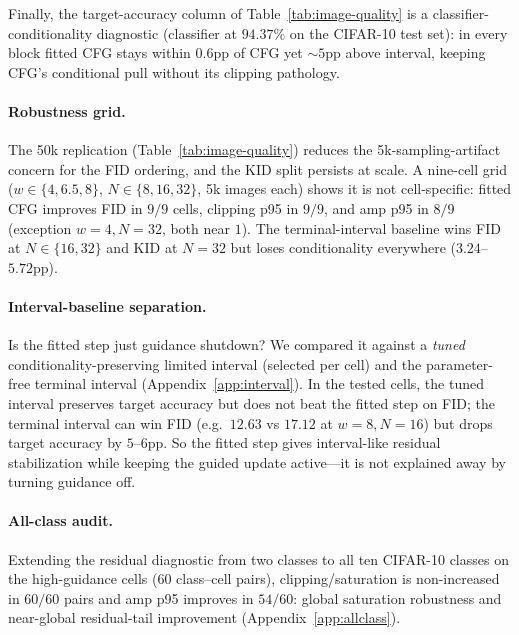 \documentclass{article} %
\theoremstyle{plain}
\theoremstyle{definition}
\theoremstyle{remark}
\providecommand{\verify}[1]{} %
\begin{document}
Finally, the target-accuracy column of Table~\ref{tab:image-quality} is a
classifier-conditionality diagnostic (classifier at $94.37\%$ on the CIFAR-10 test
set): in every block fitted CFG stays within $0.6$pp of CFG yet ${\sim}5$pp
above interval, keeping CFG's conditional pull without its clipping pathology.

\paragraph{Robustness grid.}
The 50k replication (Table~\ref{tab:image-quality}) reduces the 5k-sampling-artifact
concern for the FID ordering, and the KID split persists at scale.  A nine-cell grid
($w\in\{4,6.5,8\}$, $N\in\{8,16,32\}$, 5k images each) shows it is not
cell-specific: fitted CFG improves FID in $9/9$ cells, clipping p95 in $9/9$,
and amp p95 in $8/9$ (exception $w{=}4,N{=}32$, both near $1$).  The
terminal-interval baseline wins FID at $N\in\{16,32\}$ and KID at $N=32$ but
loses conditionality everywhere ($3.24$--$5.72$pp).

\paragraph{Interval-baseline separation.}
Is the fitted step just guidance shutdown?  We compared it against a
\emph{tuned} conditionality-preserving limited interval (selected per cell) and
the parameter-free terminal interval (Appendix~\ref{app:interval}).  In the
tested cells, the tuned interval preserves target accuracy but does not beat the
fitted step on FID; the terminal interval can win FID (e.g.\ $12.63$ vs $17.12$
at $w{=}8,N{=}16$) but drops target accuracy by $5$--$6$pp.  So the fitted step gives interval-like
residual stabilization while keeping the guided update active---it is not
explained away by turning guidance off.

\paragraph{All-class audit.}
Extending the residual diagnostic from two classes to all ten CIFAR-10 classes on the
high-guidance cells (60 class--cell pairs), clipping/saturation is non-increased
in $60/60$ pairs and amp p95 improves in $54/60$: global saturation robustness
and near-global residual-tail improvement (Appendix~\ref{app:allclass}).
\end{document}
